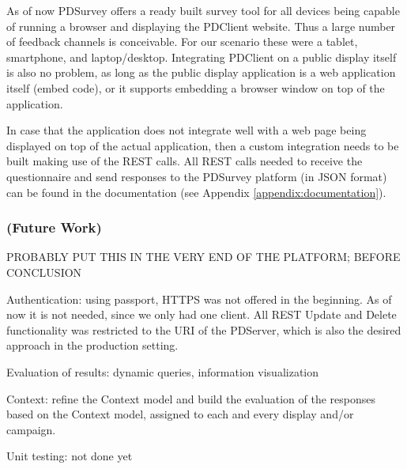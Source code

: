 	As of now PDSurvey offers a ready built survey tool for all devices being capable of running a browser and displaying the PDClient website. Thus a large number of feedback channels is conceivable. For our scenario these were a tablet, smartphone, and laptop/desktop. Integrating PDClient on a public display itself is also no problem, as long as the public display application is a web application itself (embed code), or it supports embedding a browser window on top of the application. 

	In case that the application does not integrate well with a web page being displayed on top of the actual application, then a custom integration needs to be built making use of the REST calls. All REST calls needed to receive the questionnaire and send responses to the PDSurvey platform (in JSON format) can be found in the documentation (see Appendix \ref{appendix:documentation}).



	\subsubsection{(Future Work)}

		PROBABLY PUT THIS IN THE VERY END OF THE PLATFORM; BEFORE CONCLUSION


		Authentication: using passport, HTTPS was not offered in the beginning. As of now it is not needed, since we only had one client. All REST Update and Delete functionality was restricted to the URI of the PDServer, which is also the desired approach in the production setting.

		Evaluation of results: dynamic queries, information visualization

		Context: refine the Context model and build the evaluation of the responses based on the Context model, assigned to each and every display and/or campaign.

		Unit testing: not done yet

